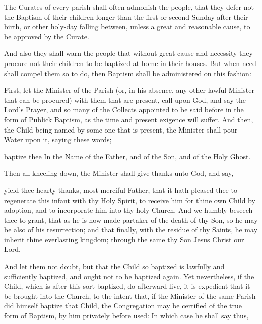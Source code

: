 
\begin{rubric}
The Curates of every parish shall often admonish the people, that they defer not the Baptism of their children longer than the first or second Sunday after their birth, or other holy-day falling between, unless a great and reasonable cause, to be approved by the Curate.
\end{rubric}

\begin{rubric}
And also they shall warn the people that without great cause and necessity they procure not their children to be baptized at home in their houses.
But when need shall compel them so to do, then Baptism shall be administered on this fashion:
\end{rubric}

\begin{rubric}
First, let the Minister of the Parish (or, in his absence, any other lawful Minister that can be procured) with them that are present, call upon God, and say the Lord's Prayer, and so many of the Collects appointed to be said before in the form of Publick Baptism, as the time and present exigence will suffer.
And then, the Child being named by some one that is present, the Minister shall pour Water upon it, saying these words;
\end{rubric}

 baptize thee In the Name of the Father, and of the Son, and of the Holy Ghost.

\begin{rubric}
Then all kneeling down, the Minister shall give thanks unto God, and say,
\end{rubric}

 yield thee hearty thanks, most merciful Father, that it hath pleased thee to regenerate this infant with thy Holy Spirit, to receive him for thine own Child by adoption, and to incorporate him into thy holy Church.
And we humbly beseech thee to grant, that as he is now made partaker of the death of thy Son, so he may be also of his resurrection; and that finally, with the residue of thy Saints, he may inherit thine everlasting kingdom; through the same thy Son Jesus Christ our Lord.

\newpage

\begin{rubric}
And let them not doubt, but that the Child so baptized is lawfully and sufficiently baptized, and ought not to be baptized again.
Yet nevertheless, if the Child, which is after this sort baptized, do afterward live, it is expedient that it be brought into the Church, to the intent that, if the Minister of the same Parish did himself baptize that Child, the Congregation may be certified of the true form of Baptism, by him privately before used: In which case he shall say thus,
\end{rubric}

